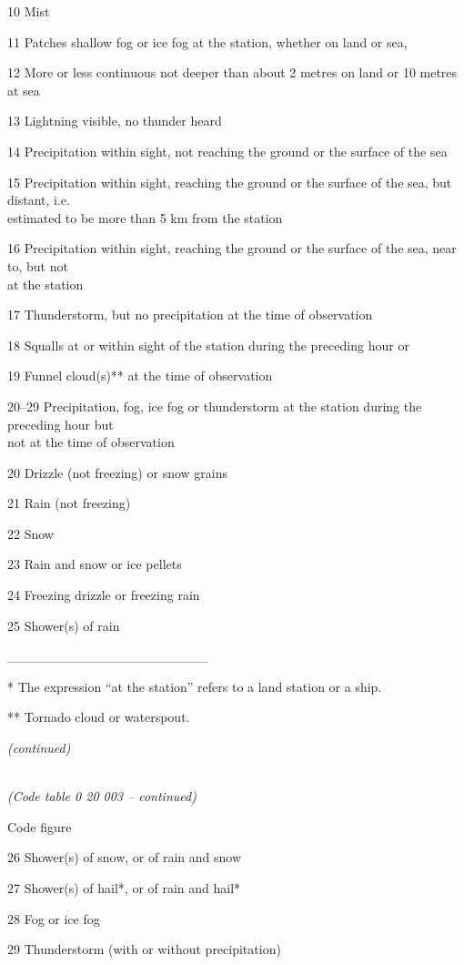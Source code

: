 10 Mist

11 Patches shallow fog or ice fog at the station, whether on land or sea,

12 More or less continuous not deeper than about 2 metres on land or 10 metres at sea

13 Lightning visible, no thunder heard

14 Precipitation within sight, not reaching the ground or the surface of the sea

15 Precipitation within sight, reaching the ground or the surface of the sea, but distant, i.e.\\
estimated to be more than 5 km from the station

16 Precipitation within sight, reaching the ground or the surface of the sea, near to, but not\\
at the station

17 Thunderstorm, but no precipitation at the time of observation

18 Squalls at or within sight of the station during the preceding hour or

19 Funnel cloud(s)** at the time of observation

20--29 Precipitation, fog, ice fog or thunderstorm at the station during the preceding hour but\\
not at the time of observation

20 Drizzle (not freezing) or snow grains

21 Rain (not freezing)

22 Snow

23 Rain and snow or ice pellets

24 Freezing drizzle or freezing rain

25 Shower(s) of rain

\_\_\_\_\_\_\_\_\_\_\_\_\_\_\_\_\_\_\_\_\_

* The expression ``at the station'' refers to a land station or a ship.

** Tornado cloud or waterspout.

\emph{(continued)}

\emph{\\
(Code table 0 20 003 -- continued)}

Code figure

26 Shower(s) of snow, or of rain and snow

27 Shower(s) of hail*, or of rain and hail*

28 Fog or ice fog

29 Thunderstorm (with or without precipitation)

